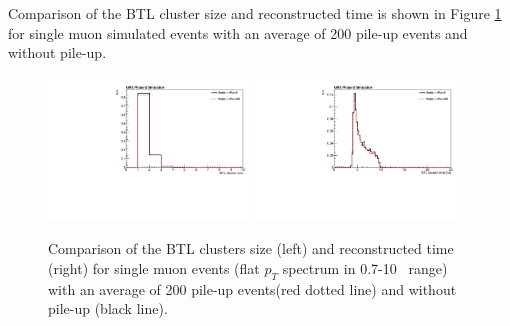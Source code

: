 Comparison of the BTL cluster size and reconstructed time 
is shown in Figure \ref{fig:clusterMuPuComp} for single muon simulated events with an average of 200 pile-up events and without pile-up.

\begin{figure}[!h]
\centering
\includegraphics[width=0.48\textwidth]{fig/performance/ClusterAndTracks/BTLbestCluster_size_muPUcomp.pdf}
\includegraphics[width=0.48\textwidth]{fig/performance/ClusterAndTracks/BTLbestCluster_time_muPUcomp.pdf}
\caption{Comparison of the BTL clusters size (left) and reconstructed time (right)
for single muon events (flat $p_{T}$ spectrum in 0.7-10~ range) with an average of 200 pile-up events(red dotted line) and without pile-up (black line).}
\label{fig:clusterMuPuComp}
\end{figure}

